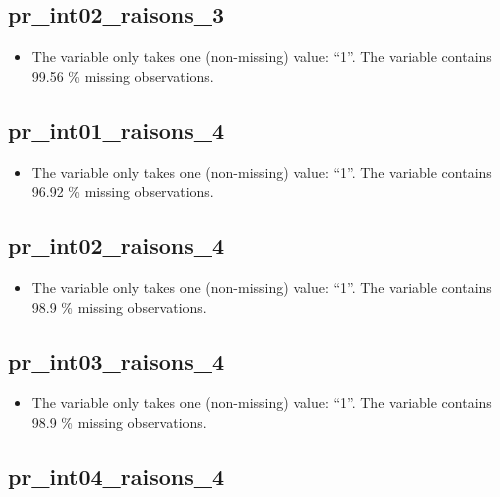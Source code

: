 \documentclass[
  letterpaper,
  DIV=11,
  numbers=noendperiod]{scrartcl}
\providecommand{\tightlist}{%
  \setlength{\itemsep}{0pt}\setlength{\parskip}{0pt}}
\begin{document}
\fullline

\subsection{pr\_int02\_raisons\_3}\label{pr_int02_raisons_3}

\begin{itemize}
\tightlist
\item
  The variable only takes one (non-missing) value: ``1''. The variable
  contains 99.56 \% missing observations.
\end{itemize}

\fullline

\subsection{pr\_int01\_raisons\_4}\label{pr_int01_raisons_4}

\begin{itemize}
\tightlist
\item
  The variable only takes one (non-missing) value: ``1''. The variable
  contains 96.92 \% missing observations.
\end{itemize}

\fullline

\subsection{pr\_int02\_raisons\_4}\label{pr_int02_raisons_4}

\begin{itemize}
\tightlist
\item
  The variable only takes one (non-missing) value: ``1''. The variable
  contains 98.9 \% missing observations.
\end{itemize}

\fullline

\subsection{pr\_int03\_raisons\_4}\label{pr_int03_raisons_4}

\begin{itemize}
\tightlist
\item
  The variable only takes one (non-missing) value: ``1''. The variable
  contains 98.9 \% missing observations.
\end{itemize}

\fullline

\subsection{pr\_int04\_raisons\_4}\label{pr_int04_raisons_4}
\end{document}

